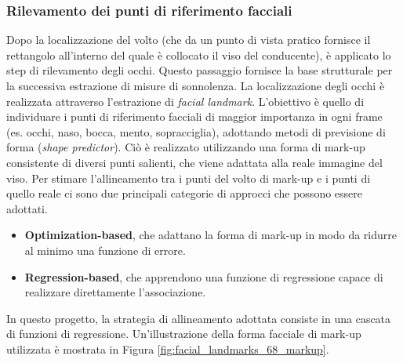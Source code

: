 \documentclass[12pt]{article}
\begin{document}
\begin{table}[h]
	\caption{Comparazione tra i principali algoritmi di localizzazione del volto.}
	\label{table:face_detection}
\end{table}

\subsubsection{Rilevamento dei punti di riferimento facciali}
\label{subsubsec:facial_landmarks}

Dopo la localizzazione del volto (che da un punto di vista pratico fornisce il rettangolo all'interno del quale è collocato il viso del conducente), è applicato lo step di rilevamento degli occhi. Questo passaggio fornisce la base strutturale per la successiva estrazione di misure di sonnolenza. La localizzazione degli occhi è realizzata attraverso l'estrazione di \textit{facial landmark}. L'obiettivo è quello di individuare i punti di riferimento facciali di maggior importanza in ogni frame (es. occhi, naso, bocca, mento, sopracciglia), adottando metodi di previsione di forma (\textit{shape predictor}). Ciò è realizzato utilizzando una forma di mark-up consistente di diversi punti salienti, che viene adattata alla reale immagine del viso. Per stimare l'allineamento tra i punti del volto di mark-up e i punti di quello reale ci sono due principali categorie di approcci che possono essere adottati.
\begin{itemize}
	\item \textbf{Optimization-based}, che adattano la forma di mark-up in modo da ridurre al minimo una funzione di errore.
	\item \textbf{Regression-based}, che apprendono una funzione di regressione capace di realizzare direttamente l'associazione.
\end{itemize}
In questo progetto, la strategia di allineamento adottata consiste in una cascata di funzioni di regressione. Un'illustrazione della forma facciale di mark-up utilizzata è mostrata in Figura \ref{fig:facial_landmarks_68_markup}.
\end{document}
